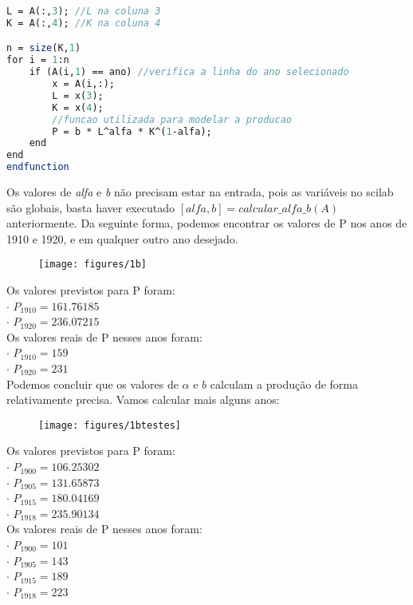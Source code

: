 \documentclass[leqno]{article}
\numberwithin{equation}{section}
\begin{document}
\begin{enumerate}
\begin{sol}
\begin{lstlisting}[style=mystyle, language=Scilab]
L = A(:,3); //L na coluna 3
K = A(:,4); //K na coluna 4

n = size(K,1) 
for i = 1:n
	if (A(i,1) == ano) //verifica a linha do ano selecionado
		x = A(i,:);
		L = x(3);
		K = x(4);
		//funcao utilizada para modelar a producao
		P = b * L^alfa * K^(1-alfa); 
	end
end
endfunction
	\end{lstlisting}
\end{sol}

Os valores de \textit{alfa} e \textit{b} não precisam estar na entrada, pois as variáveis no scilab são globais, basta haver executado $[alfa, b]=calcular\_alfa\_b(A)$ anteriormente. Da seguinte forma, podemos encontrar os valores de P nos anos de 1910 e 1920, e em qualquer outro ano desejado.

\begin{figure}[H]
	\centering
	\texttt{[image: figures/1b]}
\end{figure}

Os valores previstos para P foram:\\
$\cdot$ $P_{1910} = 161.76185$\\
$\cdot$ $P_{1920} = 236.07215$\\

Os valores reais de P nesses anos foram:\\
$\cdot$ $P_{1910} = 159$\\
$\cdot$ $P_{1920} = 231$\\

Podemos concluir que os valores de $\alpha$ e $b$ calculam a produção de forma relativamente precisa. Vamos calcular mais alguns anos:

\begin{figure}[H]
	\centering
	\texttt{[image: figures/1btestes]}
\end{figure}
\newpage
Os valores previstos para P foram:\\
$\cdot$ $P_{1900} = 106.25302$\\
$\cdot$ $P_{1905} = 131.65873$\\
$\cdot$ $P_{1915} = 180.04169$\\
$\cdot$ $P_{1918} = 235.90134$\\

Os valores reais de P nesses anos foram:\\
$\cdot$ $P_{1900} = 101$\\
$\cdot$ $P_{1905} = 143$\\
$\cdot$ $P_{1915} = 189$\\
$\cdot$ $P_{1918} = 223$\\


\end{enumerate}
\end{document}
